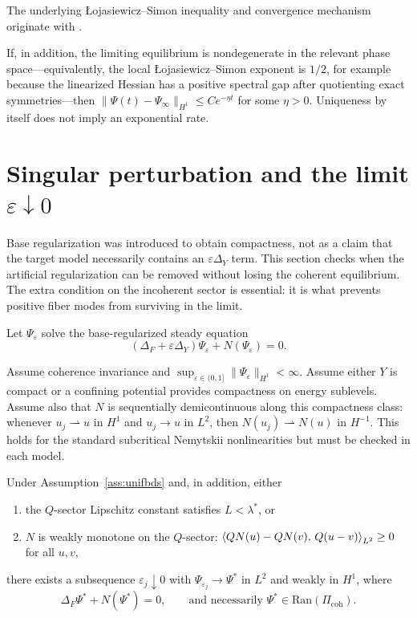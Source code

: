 \documentclass[11pt]{article}
\providecommand{\PiCoh}{\Pi_{\mathrm{coh}}}
\providecommand{\Qop}{Q}
\providecommand{\Ran}{\mathrm{Ran}}
\providecommand{\FPpdf}[2]{\texorpdfstring{#1}{#2}}
\providecommand{\lamstar}{\ensuremath{\lambda^{\ast}}}
\providecommand{\epsdown}{\ensuremath{\varepsilon\downarrow 0}}
\begin{document}
\begin{remark}[Reference]
The underlying \L{}ojasiewicz--Simon inequality and convergence mechanism originate with \cite{Simon1983}.
\end{remark}

\begin{corollary}
If, in addition, the limiting equilibrium is nondegenerate in the relevant
phase space---equivalently, the local \L{}ojasiewicz--Simon exponent is
$1/2$, for example because the linearized Hessian has a positive spectral
gap after quotienting exact symmetries---then
$\|\Psi(t)-\Psi_\infty\|_{H^1}\le Ce^{-\eta t}$ for some $\eta>0$.
Uniqueness by itself does not imply an exponential rate.
\end{corollary}

\section{Singular perturbation and the limit \FPpdf{$\epsdown$}{eps->0}}

Base regularization was introduced to obtain compactness, not as a claim that
the target model necessarily contains an $\varepsilon\Delta_Y$ term.  This
section checks when the artificial regularization can be removed without
losing the coherent equilibrium.  The extra condition on the incoherent
sector is essential: it is what prevents positive fiber modes from surviving
in the limit.

Let $\Psi_\varepsilon$ solve the base-regularized steady equation
\[
(\Delta_F+\varepsilon\Delta_Y)\Psi_\varepsilon + N(\Psi_\varepsilon)=0.
\]

\begin{assumption}\label{ass:unifbds}
Assume coherence invariance and $\sup_{\varepsilon\in(0,1]}\|\Psi_\varepsilon\|_{H^1}<\infty$.
Assume either $Y$ is compact or a confining potential provides compactness on energy sublevels.
Assume also that $N$ is sequentially demicontinuous along this compactness
class: whenever $u_j\rightharpoonup u$ in $H^1$ and $u_j\to u$ in $L^2$,
then $N(u_j)\rightharpoonup N(u)$ in $H^{-1}$. This holds for the standard
subcritical Nemytskii nonlinearities but must be checked in each model.
\end{assumption}

\begin{theorem}
Under Assumption~\ref{ass:unifbds} and, in addition, either
\begin{enumerate}[label=\textup{(\roman*)}]
\item the $\Qop$-sector Lipschitz constant satisfies $L<\lamstar$, or
\item $N$ is weakly monotone on the $\Qop$-sector:
$\ip{\Qop N(u)-\Qop N(v)}{\Qop(u-v)}_{L^2}\ge 0$ for all $u,v$,
\end{enumerate}
there exists a subsequence $\varepsilon_j\downarrow 0$ with $\Psi_{\varepsilon_j}\to \Psi^\ast$ in $L^2$ and weakly in $H^1$,
where
\[
\Delta_F\Psi^\ast + N(\Psi^\ast)=0,\qquad \text{and necessarily }\Psi^\ast\in \Ran(\PiCoh).
\]
\end{theorem}
\end{document}
